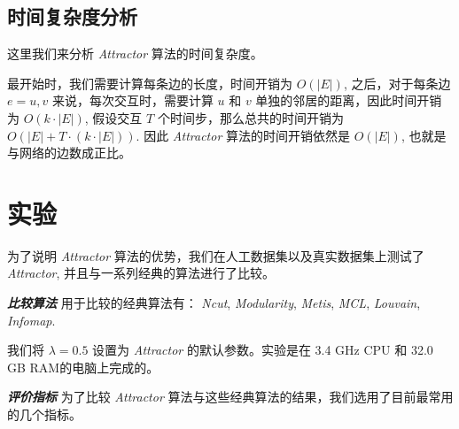 
\subsection{时间复杂度分析}
这里我们来分析 \emph{Attractor} 算法的时间复杂度。\par
最开始时，我们需要计算每条边的长度，时间开销为 $O(|E|)$, 之后，对于每条边 $e = {u, v}$ 来说，每次交互时，需要计算 $u$ 和 $v$ 单独的邻居的距离，因此时间开销为 $O(k \cdot |E|)$, 假设交互 $T$ 个时间步，那么总共的时间开销为 $O(|E| + T \cdot (k \cdot |E|))$. 因此 \emph{Attractor} 算法的时间开销依然是 $O(|E|)$, 也就是与网络的边数成正比。

\section{实验}
\label{sec:experiment}
为了说明 \emph{Attractor} 算法的优势，我们在人工数据集以及真实数据集上测试了 \emph{Attractor}, 并且与一系列经典的算法进行了比较。 \par
\vspace{2mm}
\textbf{\emph{比较算法}} 用于比较的经典算法有： \emph{Ncut}, \emph{Modularity}, \emph{Metis}, \emph{MCL}, \emph{Louvain}, \emph{Infomap}. \par
我们将 $\lambda = 0.5$ 设置为 \emph{Attractor} 的默认参数。实验是在 3.4 GHz CPU 和 32.0 GB RAM的电脑上完成的。 \par
\vspace{2mm}
\textbf{\emph{评价指标}} 为了比较 \emph{Attractor} 算法与这些经典算法的结果，我们选用了目前最常用的几个指标。

